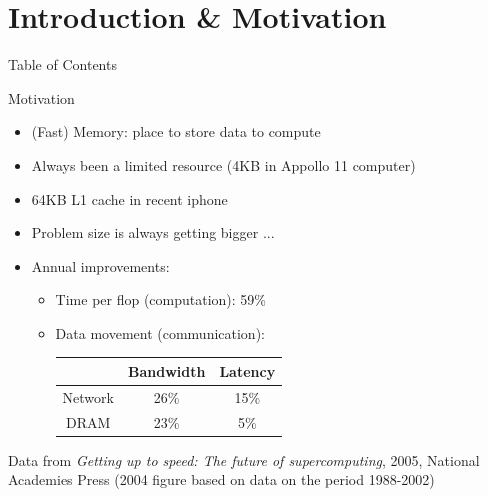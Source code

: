 \documentclass[
	12pt, %
]{beamer}
\begin{document}
\section{Introduction \& Motivation}
\begin{frame}{Table of Contents} 
	\tableofcontents[currentsection] %
\end{frame}
\begin{frame}{Motivation}
	\begin{itemize}
		\item (Fast) Memory: place to store data to compute
		\vfill
		\item Always been a limited resource (4KB in Appollo 11 computer)
		\vfill
		\item 64KB L1 cache  in recent iphone 
		\vfill
		\item Problem size is always getting bigger ...
		\vfill
		\item Annual improvements:
		\begin{itemize}
			\item Time per flop (computation): 59\%
   			\item Data movement (communication):\\
			\begin{tabular}{c|c|c}
				& Bandwidth & Latency\\
				\hline
				Network & 26\% & 15\%\\
				DRAM & 23\% & 5\%\\
			\end{tabular}
		\end{itemize}
	\end{itemize}
	\footnotesize  Data from \textit{Getting up to speed: The future of supercomputing},
	2005, National Academies Press (2004 figure based on data on the
	period 1988-2002)
\end{frame}
\end{document}

